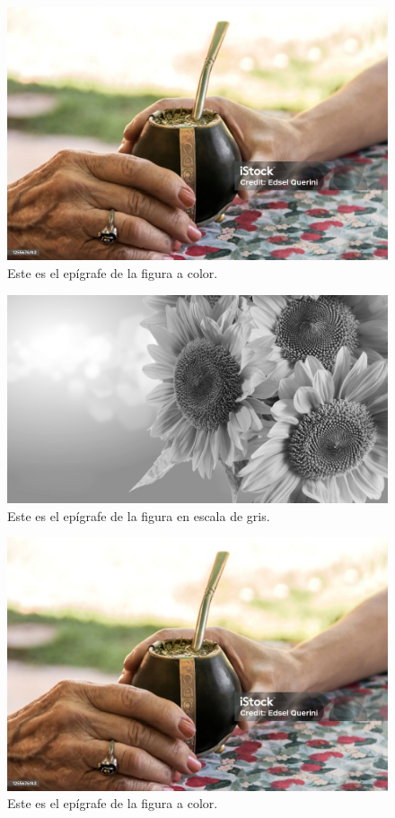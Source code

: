 \ifPDF
\begin{figure}[!ht]
\centering
\includegraphics[width=\linewidth]{./media/imagen1.jpg}
\caption{Este es el epígrafe de la figura a color.}
\end{figure}
	\else
	\ifBLACKPDF
	\begin{figure}[!ht]
	\centering
	\includegraphics[width=\linewidth]{./media/bn-imagen1.png}
	\caption{Este es el epígrafe de la figura en escala de gris.}
	\end{figure}
		\else
		\ifHTML
		\begin{figure}
		\centering
		\includegraphics[width=\linewidth]{./media/imagen1.jpg}
		\caption{Este es el epígrafe de la figura a color.}
		\end{figure}

